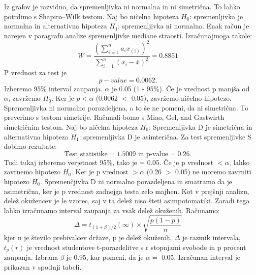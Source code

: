\documentclass[a4paper,11pt]{article}
\begin{document}
Iz grafov je razvidno, da spremenljivka ni normalna in ni simetrična. To lahko potrdimo s Shapiro–Wilk testom. Naj bo ničelna hipoteza \(H_0\): spremenljivka je normalna in alternativna hipoteza \(H_1\): spremenljivka ni normalna. Enak račun je narejen v paragrafu analize spremenljivke mediane straosti. Izračunajmoga takole:
\[W = \frac{(\sum_{i = 1}^{n}a_i x_{(i)})^2}{\sum_{i = 1}^{n}(x_i - \overset{\_}{x})^2} = 0.8851\]
 P vrednost za test je 
\[ p-value = 0.0062. \]
Izberemo 95\% interval zaupanja. \(\alpha\) je 0.05 (1 - 95\%). Če je vrednost p manjša od \(\alpha\), zavržemo \(H_0\). Ker je \(p < \alpha\) (0.0062 \(<\) 0.05), zavržemo ničelno hipotezo. Spremenljivka ni normalno porazdeljena, a to še ne pomeni, da ni simetrična. To preverimo s testom simetrije. Računali bomo s Miao, Gel, and Gastwirth simetričnim testom. Naj bo ničelna hipoteza \(H_0\): Spremenljivka D je simetrična in alternativna hipoteza \(H_1\): spremenljivka D je asimterična. Za test spremenljivke S dobimo rezultate:
\[\text{Test statistike} = 1.5009 \text{ in p-value} =  0.26.\]
Tudi tukaj izberemo verjetnost 95\%, tako je \alpha = 0.05. Če je p vrednost \(< \alpha\), lahko zavrnemo hipotezo \(H_0\). Ker je p vrednost \(> \alpha\) (0.26 \(>\) 0.05) ne moremo zavrniti hipotezo \(H_0\). Spremenčjivka D ni normalno porazdeljena in smatramo da je asimetrična, ker je p vrednost zadnejga testa zelo majhen. Kot v prejšnji analizu, delež okužencev je le vzorec, saj v ta delež niso šteti asimpotomatiki. Zaradi tega lahko izračunamo interval zaupanja za vsak delež okuženih. Računamo:
\[\Delta = t_{(1 + \beta) /2}(\infty) \times \sqrt{\frac{p(1 - p)}{n}}\]
kjer n je število prebivalcev države, p je delež okuženih, \(\Delta\) je razmik intervala, \(t_{p}(r)\) je vrednost studentove t-porazdelitve s r stopnjami svobode in p procent zaupanja. Izbrana \(\beta\) je 0.95, kar pomeni, da je \(\alpha = \) 0.05. Izračunan interval je prikazan v spodnji tabeli. \\
\end{document}
